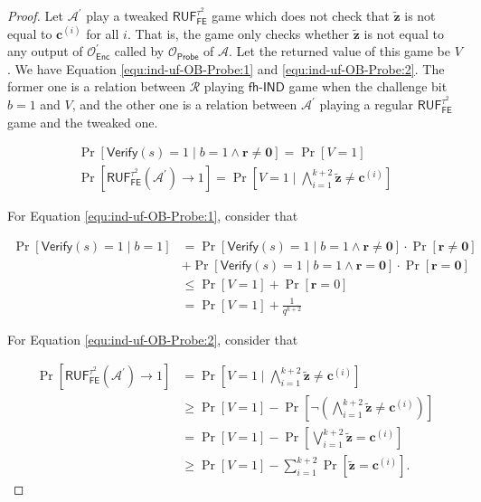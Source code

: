 \begin{proof}
Let $\mathcal{A}^\prime$ play a tweaked $\textsf{RUF}_\textsf{FE}^{\tau^2}$ game which does not check that $\mathbf{\tilde{z}}$ is not equal to $\mathbf{c}^{(i)}$ for all $i$. That is, the game only checks whether $\mathbf{\tilde{z}}$ is not equal to any output of $\mathcal{O}^\prime_\textsf{Enc}$ called by $\mathcal{O}_\textsf{Probe}$ of $\mathcal{A}$. Let the returned value of this game be $V$. We have Equation \ref{equ:ind-uf-OB-Probe:1} and \ref{equ:ind-uf-OB-Probe:2}. The former one is a relation between $\mathcal{R}$ playing $\textsf{fh-IND}$ game when the challenge bit $b=1$ and $V$, and the other one is a relation between $\mathcal{A}^\prime$ playing a regular $\textsf{RUF}_\textsf{FE}^{\tau^2}$ game and the tweaked one.

\begin{gather}
	\Pr[\textsf{Verify}(s) = 1 \mid b = 1 \wedge \mathbf{r} \neq \mathbf{0}] = \Pr[V = 1] \label{equ:ind-uf-OB-Probe:1} \\
	\Pr[\textsf{RUF}_\textsf{FE}^{\tau^2}(\mathcal{A}^\prime) \to 1] = \Pr\left[ V = 1 \mid \bigwedge_{i=1}^{k+2} \mathbf{\tilde{z}} \neq \mathbf{c}^{(i)} \right] \label{equ:ind-uf-OB-Probe:2}
\end{gather}

\noindent For Equation \ref{equ:ind-uf-OB-Probe:1}, consider that

\begin{align*}
	\Pr[\textsf{Verify}(s) = 1 \mid b = 1]
	&= \Pr[\textsf{Verify}(s) = 1 \mid b = 1 \wedge \mathbf{r} \neq \mathbf{0}] \cdot \Pr[\mathbf{r} \neq \mathbf{0}] \\
	&+ \Pr[\textsf{Verify}(s) = 1 \mid b = 1 \wedge \mathbf{r} = \mathbf{0}] \cdot \Pr[\mathbf{r} = \mathbf{0}] \\
	&\leq \Pr[V = 1] + \Pr[\mathbf{r} = 0] \\
	&= \Pr[V = 1] + \frac{1}{q^{k+2}} 
\end{align*}

\noindent For Equation \ref{equ:ind-uf-OB-Probe:2}, consider that

\begin{align*}
	\Pr[\textsf{RUF}_\textsf{FE}^{\tau^2}(\mathcal{A}^\prime) \to 1] 
	&= \Pr\left[ V = 1 \mid \bigwedge_{i=1}^{k+2} \mathbf{\tilde{z}} \neq \mathbf{c}^{(i)} \right] \\ 
	& \geq \Pr[V = 1] - \Pr \left[ \neg  \left( \bigwedge_{i=1}^{k+2} \mathbf{\tilde{z}} \neq \mathbf{c}^{(i)} \right) \right] \\
	& = \Pr[V = 1] - \Pr \left[ \bigvee_{i=1}^{k+2} \mathbf{\tilde{z}} = \mathbf{c}^{(i)} \right] \\
	& \geq \Pr[V = 1] - \sum_{i=1}^{k+2} \Pr[\mathbf{\tilde{z}} = \mathbf{c}^{(i)}].
\end{align*}


\end{proof}
